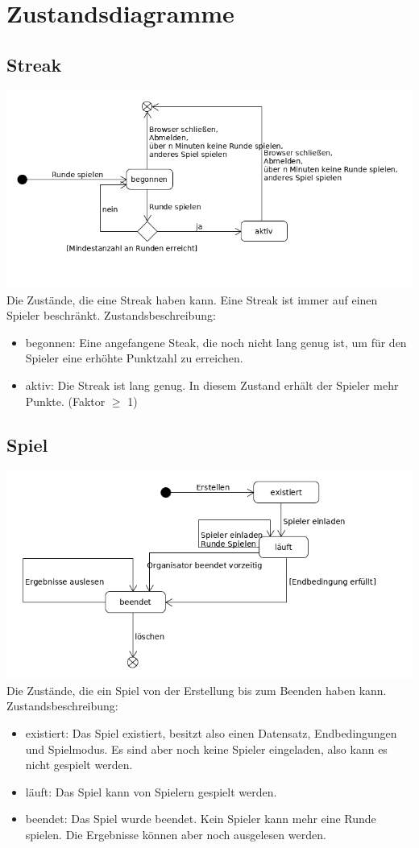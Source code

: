 \documentclass[a4paper]{scrreprt}
\begin{document}
    \section{Zustandsdiagramme}
    \subsection{Streak}
    \label{fig:Streak_State}
    \includegraphics[width=\textwidth]{uml/export/Streak_Zustand.png}
    Die Zustände, die eine Streak haben kann. Eine Streak ist immer auf einen Spieler beschränkt.
    Zustandsbeschreibung:
    \begin{itemize}
    \item begonnen: Eine angefangene Steak, die noch nicht lang genug ist, um für den Spieler eine erhöhte Punktzahl zu erreichen.
    \item aktiv: Die Streak ist lang genug. In diesem Zustand erhält der Spieler mehr Punkte. (Faktor $\geq$ 1)
    \end{itemize}
    \subsection{Spiel}
    \label{fig:Spiel_State}
    \includegraphics[width=\textwidth]{uml/export/Spiel_Zustand.png}
    Die Zustände, die ein \Gls{Spiel} von der Erstellung bis zum Beenden haben kann.
    Zustandsbeschreibung:
    \begin{itemize}
    \item existiert: Das \Gls{Spiel} existiert, besitzt also einen Datensatz, Endbedingungen und Spielmodus. Es sind aber noch keine Spieler eingeladen, also kann es nicht gespielt werden.
    \item läuft: Das \Gls{Spiel} kann von Spielern gespielt werden.
    \item beendet: Das \Gls{Spiel} wurde beendet. Kein Spieler kann mehr eine Runde spielen. Die Ergebnisse können aber noch ausgelesen werden.
    \end{itemize}
\end{document}

